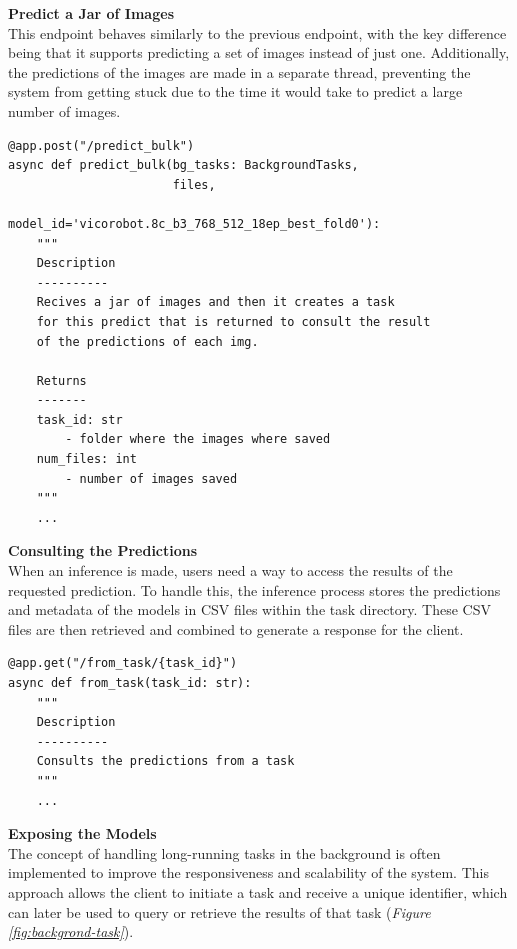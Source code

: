\vspace{0.5cm}
\textbf{Predict a Jar of Images} \\

This endpoint behaves similarly to the previous endpoint, with the key difference being that it supports predicting a set of images instead of just one. Additionally, the predictions of the images are made in a separate thread, preventing the system from getting stuck due to the time it would take to predict a large number of images.

\begin{Verbatim}[fontsize=\scriptsize]
@app.post("/predict_bulk")
async def predict_bulk(bg_tasks: BackgroundTasks,
                       files,
                       model_id='vicorobot.8c_b3_768_512_18ep_best_fold0'):
    """
    Description
    ----------
    Recives a jar of images and then it creates a task
    for this predict that is returned to consult the result
    of the predictions of each img.

    Returns
    -------
    task_id: str
        - folder where the images where saved
    num_files: int
        - number of images saved
    """
    ...
\end{Verbatim}

\vspace{0.5cm}
\textbf{Consulting the Predictions} \\

When an inference is made, users need a way to access the results of the requested prediction. To handle this, the inference process stores the predictions and metadata of the models in CSV files within the task directory. These CSV files are then retrieved and combined to generate a response for the client.

\begin{Verbatim}[fontsize=\scriptsize]
@app.get("/from_task/{task_id}")
async def from_task(task_id: str):
    """
    Description
    ----------
    Consults the predictions from a task
    """
    ...
\end{Verbatim}

\vspace{0.5cm}
\textbf{Exposing the Models} \\

The concept of handling long-running tasks in the background is often implemented to improve the responsiveness and scalability of the system. This approach allows the client to initiate a task and receive a unique identifier, which can later be used to query or retrieve the results of that task (\textit{Figure \ref{fig:backgrond-task}}). \\


